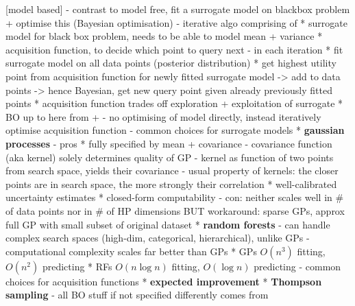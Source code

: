 \documentclass[twoside,11pt]{article}
\begin{document}
[model based]
- contrast to model free, fit a surrogate model on blackbox problem + optimise this
(Bayesian optimisation)
- iterative algo comprising of
  * surrogate model for black box problem, needs to be able to model mean + variance
  * acquisition function, to decide which point to query next
- in each iteration
  * fit surrogate model on all data points (posterior distribution)
  * get highest utility point from acquisition function for newly fitted surrogate model -> add to data points
  -> hence Bayesian, get new query point given already previously fitted points
  * acquisition function trades off exploration + exploitation of surrogate
  * BO up to here from \citep[chap. 1.3.2]{feurer_hyperparameter_2019} + \citep[pp. 2-3]{frazier2018tutorialbayesianoptimization}
- no optimising of model directly, instead iteratively optimise acquisition function
- common choices for surrogate models
  * \textbf{gaussian processes}
    - pros
      * fully specified by mean + covariance
        - covariance function (aka kernel) solely determines quality of GP
        - kernel as function of two points from search space, yields their covariance
        - usual property of kernels: the closer points are in search space, the more strongly their correlation \citep[p. 5]{frazier2018tutorialbayesianoptimization}
      * well-calibrated uncertainty estimates
      * closed-form computability
    - con: neither scales well in \# of data points nor in \# of HP dimensions BUT workaround: sparse GPs, approx full GP with small subset of original dataset
  * \textbf{random forests}
    - can handle complex search spaces (high-dim, categorical, hierarchical), unlike GPs
    - computational complexity scales far better than GPs
      * GPs $O(n^3)$ fitting, $O(n^2)$ predicting
      * RFs $O(n \log n)$ fitting, $O(\log n)$ predicting
- common choices for acquisition functions
  * \textbf{expected improvement}
  * \textbf{Thompson sampling}
- all BO stuff if not specified differently comes from \citep[chap. 1.3.2]{feurer_hyperparameter_2019}

  
\end{document}
